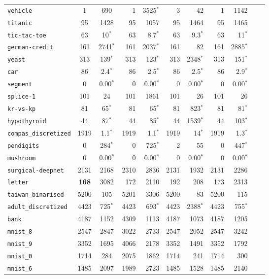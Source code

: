 \begin{tabular}{lccrrrrrrrr}
\texttt{vehicle} & 1 & 690 & 1 & 3525$^*$ & 3 & 42 & 1 & 1142\\
\texttt{titanic} & 95 & 1428 & 95 & 1057 & 95 & 1464 & 95 & 1465\\
\texttt{tic-tac-toe} & 63 & 10$^*$ & 63 & 8.7$^*$ & 63 & 9.3$^*$ & 63 & 11$^*$\\
\texttt{german-credit} & 161 & 2741$^*$ & 161 & 2037$^*$ & 161 & 82 & 161 & 2885$^*$\\
\texttt{yeast} & 313 & 139$^*$ & 313 & 123$^*$ & 313 & 2348$^*$ & 313 & 151$^*$\\
\texttt{car} & 86 & 2.4$^*$ & 86 & 2.5$^*$ & 86 & 2.5$^*$ & 86 & 2.9$^*$\\
\texttt{segment} & 0 & 0.00$^*$ & 0 & 0.00$^*$ & 0 & 0.00$^*$ & 0 & 0.00$^*$\\
\texttt{splice-1} & 101 & 24 & 101 & 1861 & 101 & 26 & 101 & 26\\
\texttt{kr-vs-kp} & 81 & 65$^*$ & 81 & 65$^*$ & 81 & 823$^*$ & 81 & 81$^*$\\
\texttt{hypothyroid} & 44 & 87$^*$ & 44 & 85$^*$ & 44 & 1539$^*$ & 44 & 103$^*$\\
\texttt{compas\_discretized} & 1919 & 1.1$^*$ & 1919 & 1.1$^*$ & 1919 & 14$^*$ & 1919 & 1.3$^*$\\
\texttt{pendigits} & 0 & 284$^*$ & 0 & 725$^*$ & 2 & 55 & 0 & 447$^*$\\
\texttt{mushroom} & 0 & 0.00$^*$ & 0 & 0.00$^*$ & 0 & 0.00$^*$ & 0 & 0.00$^*$\\
\texttt{surgical-deepnet} & 2131 & 2168 & 2310 & 2836 & 2131 & 1932 & 2131 & 2286\\
\texttt{letter} & \textbf{168} & 3082 & 172 & 2110 & 192 & 208 & 173 & 2313\\
\texttt{taiwan\_binarised} & 5200 & 105 & 5201 & 3306 & 5200 & 83 & 5200 & 115\\
\texttt{adult\_discretized} & 4423 & 725$^*$ & 4423 & 693$^*$ & 4423 & 2388$^*$ & 4423 & 755$^*$\\
\texttt{bank} & 4187 & 1152 & 4309 & 1113 & 4187 & 1073 & 4187 & 1205\\
\texttt{mnist\_8} & 2547 & 2847 & 3022 & 2733 & 2547 & 2052 & 2547 & 3242\\
\texttt{mnist\_9} & 3352 & 1695 & 4066 & 2178 & 3352 & 1491 & 3352 & 1792\\
\texttt{mnist\_0} & 1714 & 284 & 2075 & 1862 & 1714 & 241 & 1714 & 300\\
\texttt{mnist\_6} & 1485 & 2097 & 1989 & 2723 & 1485 & 1528 & 1485 & 2140\\

\end{tabular}
